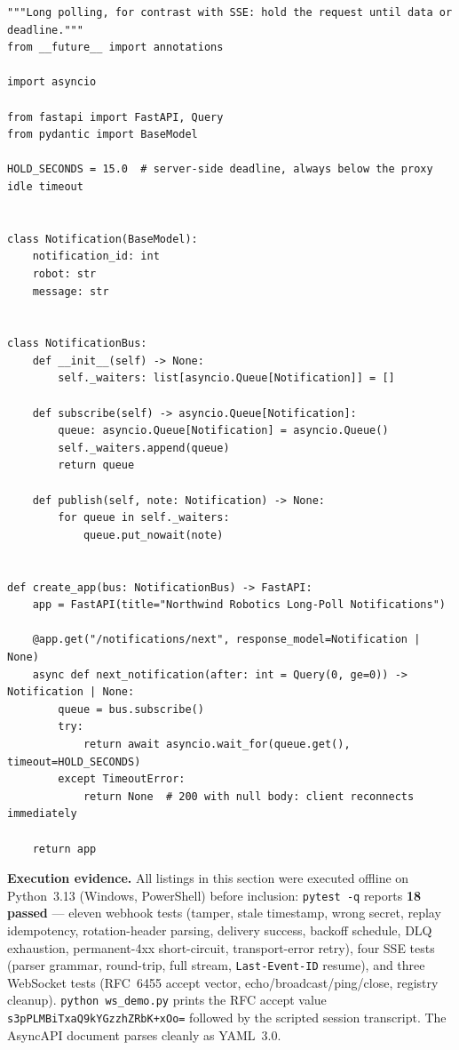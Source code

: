 \begin{verbatim}
"""Long polling, for contrast with SSE: hold the request until data or deadline."""
from __future__ import annotations

import asyncio

from fastapi import FastAPI, Query
from pydantic import BaseModel

HOLD_SECONDS = 15.0  # server-side deadline, always below the proxy idle timeout


class Notification(BaseModel):
    notification_id: int
    robot: str
    message: str


class NotificationBus:
    def __init__(self) -> None:
        self._waiters: list[asyncio.Queue[Notification]] = []

    def subscribe(self) -> asyncio.Queue[Notification]:
        queue: asyncio.Queue[Notification] = asyncio.Queue()
        self._waiters.append(queue)
        return queue

    def publish(self, note: Notification) -> None:
        for queue in self._waiters:
            queue.put_nowait(note)


def create_app(bus: NotificationBus) -> FastAPI:
    app = FastAPI(title="Northwind Robotics Long-Poll Notifications")

    @app.get("/notifications/next", response_model=Notification | None)
    async def next_notification(after: int = Query(0, ge=0)) -> Notification | None:
        queue = bus.subscribe()
        try:
            return await asyncio.wait_for(queue.get(), timeout=HOLD_SECONDS)
        except TimeoutError:
            return None  # 200 with null body: client reconnects immediately

    return app
\end{verbatim}

\begin{examplebox}
\textbf{Execution evidence.} All listings in this section were executed
offline on Python~3.13 (Windows, PowerShell) before inclusion:
\texttt{pytest -q} reports \textbf{18 passed} --- eleven webhook tests
(tamper, stale timestamp, wrong secret, replay idempotency, rotation-header
parsing, delivery success, backoff schedule, DLQ exhaustion, permanent-4xx
short-circuit, transport-error retry), four SSE tests (parser grammar,
round-trip, full stream, \texttt{Last-Event-ID} resume), and three WebSocket
tests (RFC~6455 accept vector, echo/broadcast/ping/close, registry cleanup).
\texttt{python ws\_demo.py} prints the RFC accept value
\texttt{s3pPLMBiTxaQ9kYGzzhZRbK+xOo=} followed by the scripted session
transcript. The AsyncAPI document parses cleanly as YAML~3.0.
\end{examplebox}

